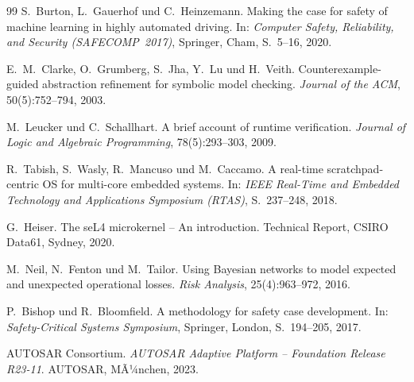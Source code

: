 ﻿\documentclass[a4paper,12pt]{article}
\theoremstyle{definition}
\begin{document}
\begin{thebibliography}{99}
S.~Burton, L.~Gauerhof und C.~Heinzemann.
\newblock Making the case for safety of machine learning in
  highly automated driving.
\newblock In: \textit{Computer Safety, Reliability, and Security
  (SAFECOMP~2017)}, Springer, Cham, S.~5--16, 2020.

E.~M.~Clarke, O.~Grumberg, S.~Jha, Y.~Lu und H.~Veith.
\newblock Counterexample-guided abstraction refinement for
  symbolic model checking.
\newblock \textit{Journal of the ACM}, 50(5):752--794, 2003.

M.~Leucker und C.~Schallhart.
\newblock A brief account of runtime verification.
\newblock \textit{Journal of Logic and Algebraic Programming},
  78(5):293--303, 2009.

R.~Tabish, S.~Wasly, R.~Mancuso und M.~Caccamo.
\newblock A real-time scratchpad-centric OS for multi-core
  embedded systems.
\newblock In: \textit{IEEE Real-Time and Embedded Technology
  and Applications Symposium (RTAS)}, S.~237--248, 2018.

G.~Heiser.
\newblock The seL4 microkernel -- An introduction.
\newblock Technical Report, CSIRO Data61, Sydney, 2020.

M.~Neil, N.~Fenton und M.~Tailor.
\newblock Using Bayesian networks to model expected and
  unexpected operational losses.
\newblock \textit{Risk Analysis}, 25(4):963--972, 2016.

P.~Bishop und R.~Bloomfield.
\newblock A methodology for safety case development.
\newblock In: \textit{Safety-Critical Systems Symposium},
  Springer, London, S.~194--205, 2017.

AUTOSAR Consortium.
\newblock \textit{AUTOSAR Adaptive Platform -- Foundation
  Release R23-11}.
\newblock AUTOSAR, MÃ¼nchen, 2023.

\end{thebibliography}
\end{document}
